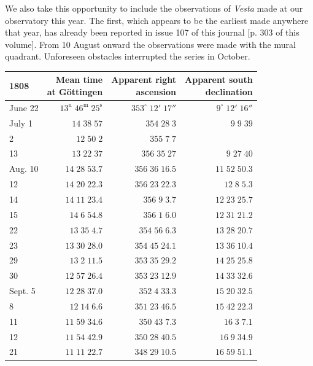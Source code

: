 \par\indent We also take this opportunity to include the observations of \emph{Vesta} made at our observatory this year. The first, which appears to be the earliest made anywhere that year, has already been reported in issue 107 of this journal [p. 303 of this volume]. From 10 August onward the observations were made with the mural quadrant. Unforeseen obstacles interrupted the series in October.


\begin{center}\fontsize{10}{12}\selectfont\setlength{\tabcolsep}{5pt}\renewcommand{\arraystretch}{1.15}\begin{tabular}{lrrr}
1808 & \shortstack{Mean time\\at Göttingen} & \shortstack{Apparent right\\ascension} & \shortstack{Apparent south\\declination}\\
\hline
June 22 & $13^{\text{u}}\;46^{\text{m}}\;25^{\text{s}}$ & $353^\circ\;12'\;17''$ & $9^\circ\;12'\;16''$\\
July  1 & $14\;38\;57$ & $354\;28\;3$ & $9\;9\;39$\\
2 & $12\;50\;2$ & $355\;7\;7$ & \\
13 & $13\;22\;37$ & $356\;35\;27$ & $9\;27\;40$\\
Aug. 10 & $14\;28\;53.7$ & $356\;36\;16.5$ & $11\;52\;50.3$\\
12 & $14\;20\;22.3$ & $356\;23\;22.3$ & $12\;8\;5.3$\\
14 & $14\;11\;23.4$ & $356\;9\;3.7$ & $12\;23\;25.7$\\
15 & $14\;6\;54.8$ & $356\;1\;6.0$ & $12\;31\;21.2$\\
22 & $13\;35\;4.7$ & $354\;56\;6.3$ & $13\;28\;20.7$\\
23 & $13\;30\;28.0$ & $354\;45\;24.1$ & $13\;36\;10.4$\\
29 & $13\;2\;11.5$ & $353\;35\;29.2$ & $14\;25\;25.8$\\
30 & $12\;57\;26.4$ & $353\;23\;12.9$ & $14\;33\;32.6$\\
Sept. 5 & $12\;28\;37.0$ & $352\;4\;33.3$ & $15\;20\;32.5$\\
8 & $12\;14\;6.6$ & $351\;23\;46.5$ & $15\;42\;22.3$\\
11 & $11\;59\;34.6$ & $350\;43\;7.3$ & $16\;3\;7.1$\\
12 & $11\;54\;42.9$ & $350\;28\;40.5$ & $16\;9\;34.9$\\
21 & $11\;11\;22.7$ & $348\;29\;10.5$ & $16\;59\;51.1$\\
\end{tabular}\end{center}


